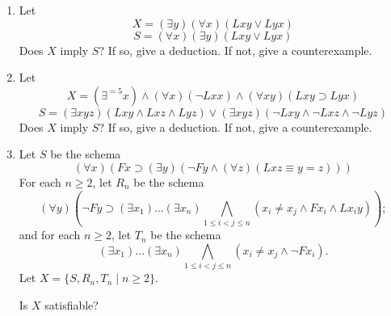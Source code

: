 \begin{mdframed}[linewidth=1]
\begin{enumerate}
    \item Let 
    \[
        X = (\exists y)(\forall x)(Lxy \vee Lyx)
    \]
    \[
        S = (\forall x)(\exists y)(Lxy \vee Lyx)
    \]
    Does $X$ imply $S$? If so, give a deduction. If not, give a counterexample. 

    \item Let
    \[
        X = (\exists^{=5}x) \land (\forall x)(\lnot Lxx) \land (\forall xy)(Lxy \supset Lyx)
    \]
    \[
        S = (\exists xyz)(Lxy \land Lxz \land Lyz) \vee (\exists xyz)(\lnot Lxy \land \lnot Lxz \land \lnot Lyz)
    \]
    Does $X$ imply $S$? If so, give a deduction. If not, give a counterexample. 

    \item Let $S$ be the schema
    \[
            (\forall x)(Fx\supset(\exists y)(\neg Fy\wedge(\forall z)(Lxz\equiv y=z)))
    \]
    For each $n\geq 2$, let $R_n$ be the schema
    \[
    (\forall y)(\neg Fy\supset(\exists x_1)\ldots(\exists x_n)\bigwedge_{1\leq i<j\leq n}(x_i\neq x_j\wedge Fx_i\wedge Lx_iy));
    \]
    and for each $n\geq 2$, let $T_n$ be the schema
    \[
    (\exists x_1)\ldots(\exists x_n)\bigwedge_{1\leq i<j\leq n}(x_i\neq x_j\wedge \neg Fx_i).
    \]
    Let $X=\{S,R_n,T_n\mid n\geq 2\}$.

    Is $X$ satisfiable?

\end{enumerate}
\end{mdframed}

